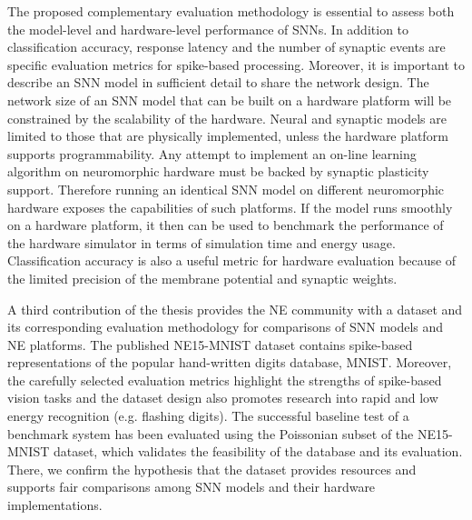 The proposed complementary evaluation methodology is essential to assess both the model-level and hardware-level performance of SNNs.
In addition to classification accuracy, response latency and the number of synaptic events are specific evaluation metrics for spike-based processing.
Moreover, it is important to describe an SNN model in sufficient detail to share the network design. 
The network size of an SNN model that can be built on a hardware platform will be constrained by the scalability of the hardware.
Neural and synaptic models are limited to those that are physically implemented, unless the hardware platform supports programmability.
Any attempt to implement an on-line learning algorithm on neuromorphic hardware must be backed by synaptic plasticity support.
Therefore running an identical SNN model on different neuromorphic hardware exposes the capabilities of such platforms.
If the model runs smoothly on a hardware platform, it then can be used to benchmark the performance of the hardware simulator in terms of simulation time and energy usage.
Classification accuracy is also a useful metric for hardware evaluation because of the limited precision of the membrane potential and synaptic weights.


A third contribution of the thesis provides the NE community with a dataset and its corresponding evaluation methodology for comparisons of SNN models and NE platforms.
The published NE15-MNIST dataset contains spike-based representations of the popular hand-written digits database, MNIST.
Moreover, the carefully selected evaluation metrics highlight the strengths of spike-based vision tasks and the dataset design also promotes research into rapid and low energy recognition (e.g. flashing digits).
The successful baseline test of a benchmark system has been evaluated using the Poissonian subset of the NE15-MNIST dataset, which validates the feasibility of the database and its evaluation.
There, we confirm the hypothesis that the dataset provides resources and supports fair comparisons among SNN models and their hardware implementations.


